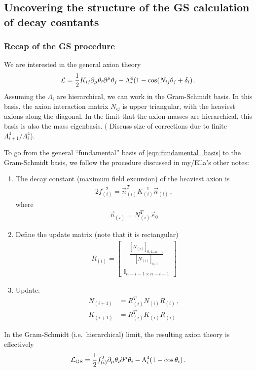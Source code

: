 \documentclass[11pt]{article}
\begin{document}
\subsection{Uncovering the structure of the GS calculation of decay cosntants}

\subsubsection{Recap of the GS procedure}
We are interested in the general axion theory
\begin{align}\label{eqn:fundamental_basis}
    {\cal L} = \frac12 K_{ij}\partial_\mu\theta_i\partial^\mu\theta_j - \Lambda_i^4(1 - \cos(N_{ij}\theta_j + \delta_i)\,.
\end{align}
Assuming the $\Lambda_i$ are hierarchical, we can work in the Gram-Schmidt basis. In this basis, the axion interaction matrix $N_{ij}$ is upper triangular, with the heaviest axions along the diagonal. In the limit that the axion masses are hierarchical, this basis is also the mass eigenbasis. ({\color{red} Discuss size of corrections due to finite ${\Lambda_{i + 1}^4}/\Lambda_i^4$}\color{black}).

To go from the general ``fundamental'' basis of \cref{eqn:fundamental_basis} to the Gram-Schmidt basis, we follow the procedure discussed in my/Ella's other notes:
\begin{enumerate}
    \item The decay constant (maximum field excursion) of the heaviest axion is 
    \begin{align}\label{eqn:decay_constants}
        2f_{(i)}^{-2} = \vec n_{(i)}^T K_{(i)}^{-1}\vec n_{(i)}\,,
    \end{align}
    where
    \begin{align}
        \vec n_{(i)}= N_{(i)}^T\vec e_0
    \end{align}
    \item Define the update matrix (note that it is rectangular)
    \begin{align}
        R_{(i)} = \left[\begin{array}{c}-\frac{[N_{(i)}]_{0,1\dots n-i}}{[N_{(i)}]_{0,0}}\\{\mathbb I}_{n-i-1\times n-i-1}\end{array}\right]
    \end{align}
    \item Update:
    \begin{align}
        N_{(i + 1)} &= R_{(i)}^T N_{(i)}R_{(i)}\,,\\
        K_{(i + 1)} &= R_{(i)}^T K_{(i)}R_{(i)}
    \end{align}
\end{enumerate}
In the Gram-Schmidt (i.e.\ hierarchical) limit, the resulting axion theory is effectively
\begin{align}
    {\cal L}_{\rm GS} = \frac12 f_{(i)}^2\partial_\mu\theta_i\partial^\mu\theta_i - \Lambda_i^4(1 - \cos\theta_i)\,.
\end{align}
\end{document}
